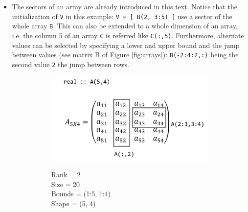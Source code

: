 \begin{itemize}
    \item The sectors of an array are already introduced in this text. Notice that the initialization of \texttt{V} in this example: \texttt{V = [ B(2, 3:5) ]} use a sector of the whole array \texttt{B}. This can also be extended to a whole dimension of an array, i.e. the column 5 of an array \texttt{C} is referred like \texttt{C(:,5)}. Furthermore, alternate values can be selected by specifying a lower and upper bound and the jump between values (see matrix B of Figure \ref{fig:arrays}): \texttt{B(-2:4:2,:)} being the second value \texttt{2} the jump between rows.
    
    \begin{figure}
        \begin{subfigure}[h]{0.5\textwidth}
            
            \centering
            \includegraphics[width = \textwidth]{./doc/Figures/Array1.png}  \\
            \begin{flushleft}
                Rank = 2 \\
                Size = 20 \\
                Bounds = (1:5, 1:4) \\
                Shape = (5, 4)
            \end{flushleft}
            
        \end{subfigure}
        \hspace{\fill}
        \begin{subfigure}[h]{0.5\textwidth}
            

\end{subfigure}
\end{figure}
\end{itemize}
